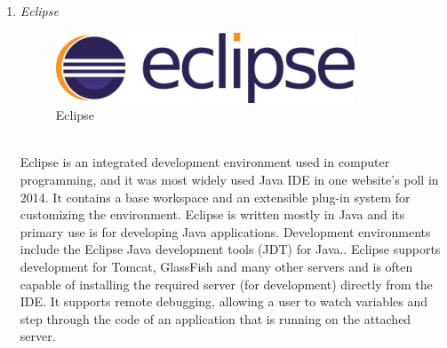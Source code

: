 \documentclass[conference]{IEEEtran}
\begin{document}
\begin{enumerate}
      \item \textit{Eclipse}
                      \begin{figure}[htbp]
    \centerline{\includegraphics[width=89mm, scale=0.5]{fig/eclipse.png}}
    \caption{Eclipse}
    \label{fig}
    \end{figure}
   \\Eclipse is an integrated development environment used in computer programming, and it was most widely used Java IDE in one website’s poll in 2014.  It contains a base workspace and an extensible plug-in system for customizing the environment. Eclipse is written mostly in Java and its primary use is for developing Java applications. Development environments include the Eclipse Java development tools (JDT) for Java.. Eclipse supports development for Tomcat, GlassFish and many other servers and is often capable of installing the required server (for development) directly from the IDE. It supports remote debugging, allowing a user to watch variables and step through the code of an application that is running on the attached server.\\
 

\end{enumerate}
\end{document}
